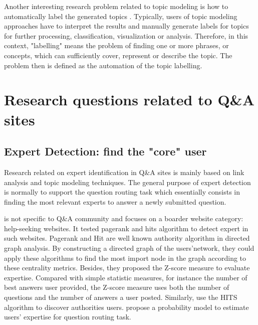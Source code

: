 Another interesting research problem related to topic modeling is how to automatically label the generated topics \cite{chp2cano2014automatictopiclabeling} \cite{chp2hulpus2013unsupervisedtopiclabeling} \cite{chp2aletras2014labelling} \cite{chp6OnConceptualLabelingOfBagOfWords} \cite{chp2lau2011automaticlabeling}. Typically, users of topic modeling approaches have to interpret the results and manually generate labels for topics for further processing, classification, visualization or analysis. Therefore, in this context, "labelling" means the problem of finding one or more phrases, or concepts, which can sufficiently cover, represent or describe the topic. The problem then is defined as the automation of the topic labelling.



\section{Research questions related to Q\&A sites}
\subsection{Expert Detection: find the "core" user}
Research related on expert identification in Q\&A sites is mainly based on link analysis and topic modeling techniques. The general purpose of expert detection is normally to support the question routing task which essentially consists in finding the most relevant experts to answer a newly submitted question. 

\cite{zhang2007expertise} is not specific to Q\&A community and focuses on a boarder website category: help-seeking websites. It tested pagerank and hits algorithm to detect expert in such websites. Pagerank and Hit are well known authority algorithm in directed graph analysis. By constructing a directed graph of the users'network, they could apply these algorithms to find the most import node in the graph according to these centrality metrics. Besides, they proposed the Z-score measure to evaluate expertise. Compared with simple statistic measures, for instance the number of best answers user provided, the Z-score measure uses both the number of questions and the number of answers a user posted. Similarly, \cite{jurczyk2007discovering} use the HITS algorithm to discover authorities users. \cite{li2010routing} propose a probability model to estimate users' expertise for question routing task. 


